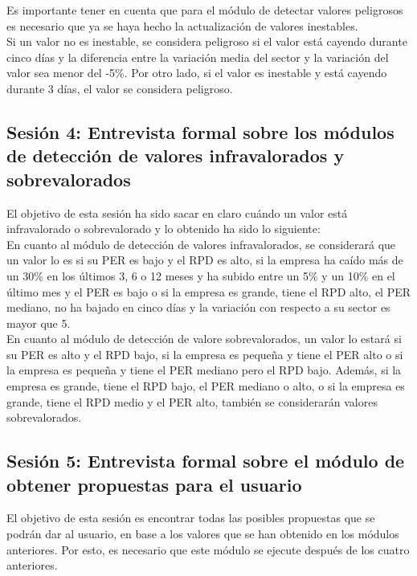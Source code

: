 \documentclass[12pt]{article}
\begin{document}
Es importante tener en cuenta que para el módulo de detectar valores peligrosos es necesario que ya se haya hecho la actualización de valores inestables.\\

Si un valor no es inestable, se considera peligroso si el valor está cayendo durante cinco días y la diferencia entre la variación media del sector y la variación del valor sea menor del -5\%. Por otro lado, si el valor es inestable y está cayendo durante 3 días, el valor se considera peligroso.

\subsection{Sesión 4: Entrevista formal sobre los módulos de detección de valores infravalorados y sobrevalorados}
El objetivo de esta sesión ha sido sacar en claro cuándo un valor está infravalorado o sobrevalorado y lo obtenido ha sido lo siguiente:\\

En cuanto al módulo de detección de valores infravalorados, se considerará que un valor lo es si su PER es bajo y el RPD es alto, si la empresa ha caído más de un 30\% en los últimos 3, 6 o 12 meses y ha subido entre un 5\% y un 10\% en el último mes y el PER es bajo o si la empresa es grande, tiene el RPD alto, el PER mediano, no ha bajado en cinco días y la variación con respecto a su sector es mayor que 5.\\

En cuanto al módulo de detección de valore sobrevalorados, un valor lo estará si su PER es alto y el RPD bajo, si la empresa es pequeña y tiene el PER alto o si la empresa es pequeña y tiene el PER mediano pero el RPD bajo. Además, si la empresa es grande, tiene el RPD bajo, el PER mediano o alto, o si la empresa es grande, tiene el RPD medio y el PER alto, también se considerarán valores sobrevalorados.\\

\subsection{Sesión 5: Entrevista formal sobre el módulo de obtener propuestas para el usuario}
El objetivo de esta sesión es encontrar todas las posibles propuestas que se podrán dar al usuario, en base a los valores que se han obtenido en los módulos anteriores. Por esto, es necesario que este módulo se ejecute después de los cuatro anteriores.
\end{document}
